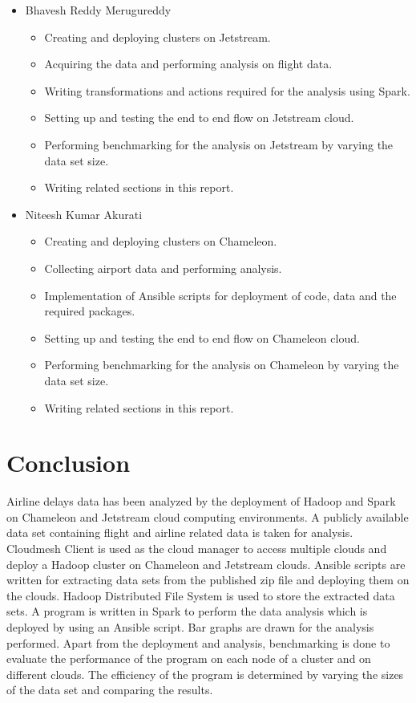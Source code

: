 \documentclass[9pt,twocolumn,twoside]{../../styles/osajnl}
\begin{document}
\begin{itemize}
\item Bhavesh Reddy Merugureddy
    \begin{itemize}
    \item Creating and deploying clusters on Jetstream.
    \item Acquiring the data and performing analysis on flight data.
    \item Writing transformations and actions required for the
      analysis using Spark.
    \item Setting up and testing the end to end flow on Jetstream cloud.
    \item Performing benchmarking for the analysis on Jetstream by
      varying the data set size.
    \item Writing related sections in this report.
    \end{itemize}

\item Niteesh Kumar Akurati
    \begin{itemize}
    \item Creating and deploying clusters on Chameleon.
    \item Collecting airport data and performing analysis. 
    \item Implementation of Ansible scripts for deployment of code,
      data and the required packages.
    \item Setting up and testing the end to end flow on Chameleon cloud.
    \item Performing benchmarking for the analysis on Chameleon by
      varying the data set size.
    \item Writing related sections in this report.
    \end{itemize}
\end{itemize}

\section{Conclusion} 

Airline delays data has been analyzed by the deployment of Hadoop and
Spark on Chameleon and Jetstream cloud computing environments. A
publicly available data set containing flight and airline related data
is taken for analysis. Cloudmesh Client is used as the cloud manager
to access multiple clouds and deploy a Hadoop cluster on Chameleon and
Jetstream clouds. Ansible scripts are written for extracting data sets
from the published zip file and deploying them on the clouds. Hadoop
Distributed File System is used to store the extracted data sets. A
program is written in Spark to perform the data analysis which is
deployed by using an Ansible script. Bar graphs are drawn for the
analysis performed. Apart from the deployment and analysis,
benchmarking is done to evaluate the performance of the program on
each node of a cluster and on different clouds. The efficiency of the
program is determined by varying the sizes of the data set and
comparing the results.
\end{document}
